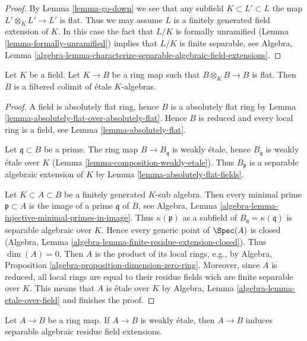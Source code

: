 \begin{proof}
By Lemma \ref{lemma-go-down} we see that any subfield
$K \subset L' \subset L$ the map $L' \otimes_K L' \to L'$ is flat.
Thus we may assume $L$ is a finitely generated field extension of $K$.
In this case the fact that $L/K$ is formally unramified
(Lemma \ref{lemma-formally-unramified})
implies that $L/K$ is finite separable, see Algebra, Lemma
\ref{algebra-lemma-characterize-separable-algebraic-field-extensions}.
\end{proof}

\begin{lemma}
\label{lemma-absolutely-flat-over-field}
Let $K$ be a field. Let $K \to B$ be a ring map such that
$B \otimes_K B \to B$ is flat. Then $B$ is a filtered colimit of
\'etale $K$-algebras.
\end{lemma}

\begin{proof}
A field is absolutely flat ring, hence $B$ is a absolutely
flat ring by Lemma \ref{lemma-absolutely-flat-over-absolutely-flat}.
Hence $B$ is reduced and every local
ring is a field, see Lemma \ref{lemma-absolutely-flat}.

\medskip\noindent
Let $\mathfrak q \subset B$ be a prime. The ring map
$B \to B_\mathfrak q$ is weakly \'etale, hence $B_\mathfrak q$
is weakly \'etale over $K$ (Lemma \ref{lemma-composition-weakly-etale}).
Thus $B_\mathfrak p$ is a separable algebraic extension of $K$ by
Lemma \ref{lemma-absolutely-flat-fields}.

\medskip\noindent
Let $K \subset A \subset B$ be a finitely generated $K$-sub algebra.
Then every minimal prime $\mathfrak p \subset A$ is the image of a prime
$\mathfrak q$ of $B$, see
Algebra, Lemma \ref{algebra-lemma-injective-minimal-primes-in-image}.
Thus $\kappa(\mathfrak p)$ as a subfield of
$B_\mathfrak q = \kappa(\mathfrak q)$ is separable algebraic over $K$.
Hence every generic point of $\Spec(A)$
is closed (Algebra, Lemma \ref{algebra-lemma-finite-residue-extension-closed}).
Thus $\dim(A) = 0$.
Then $A$ is the product of its local rings, e.g., by
Algebra, Proposition \ref{algebra-proposition-dimension-zero-ring}.
Moreover, since $A$ is reduced, all local rings are equal
to their residue fields wich are finite separable over $K$.
This means that $A$ is \'etale over $K$ by
Algebra, Lemma \ref{algebra-lemma-etale-over-field}
and finishes the proof.
\end{proof}

\begin{lemma}
\label{lemma-weakly-etale-residue-field-extensions}
Let $A \to B$ be a ring map. If $A \to B$ is weakly \'etale, then
$A \to B$ induces separable algebraic residue field extensions.
\end{lemma}

